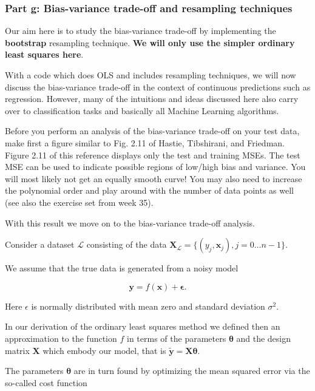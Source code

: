 \documentclass[11pt]{article}
\begin{document}
    \hypertarget{part-g-bias-variance-trade-off-and-resampling-techniques}{%
\subsubsection*{Part g: Bias-variance trade-off and resampling
techniques}\label{part-g-bias-variance-trade-off-and-resampling-techniques}}

Our aim here is to study the bias-variance trade-off by implementing the
\textbf{bootstrap} resampling technique. \textbf{We will only use the
simpler ordinary least squares here}.

With a code which does OLS and includes resampling techniques, we will
now discuss the bias-variance trade-off in the context of continuous
predictions such as regression. However, many of the intuitions and
ideas discussed here also carry over to classification tasks and
basically all Machine Learning algorithms.

Before you perform an analysis of the bias-variance trade-off on your
test data, make first a figure similar to Fig. 2.11 of Hastie,
Tibshirani, and Friedman. Figure 2.11 of this reference displays only
the test and training MSEs. The test MSE can be used to indicate
possible regions of low/high bias and variance. You will most likely not
get an equally smooth curve! You may also need to increase the
polynomial order and play around with the number of data points as well
(see also the exercise set from week 35).

With this result we move on to the bias-variance trade-off analysis.

Consider a dataset \(\mathcal{L}\) consisting of the data
\(\mathbf{X}_\mathcal{L}=\{(y_j, \boldsymbol{x}_j), j=0\ldots n-1\}\).

We assume that the true data is generated from a noisy model

    \[
\boldsymbol{y}=f(\boldsymbol{x}) + \boldsymbol{\epsilon}.
\]

    Here \(\epsilon\) is normally distributed with mean zero and standard
deviation \(\sigma^2\).

In our derivation of the ordinary least squares method we defined then
an approximation to the function \(f\) in terms of the parameters
\(\boldsymbol{\theta}\) and the design matrix \(\boldsymbol{X}\) which
embody our model, that is
\(\boldsymbol{\tilde{y}}=\boldsymbol{X}\boldsymbol{\theta}\).

The parameters \(\boldsymbol{\theta}\) are in turn found by optimizing
the mean squared error via the so-called cost function
\end{document}
